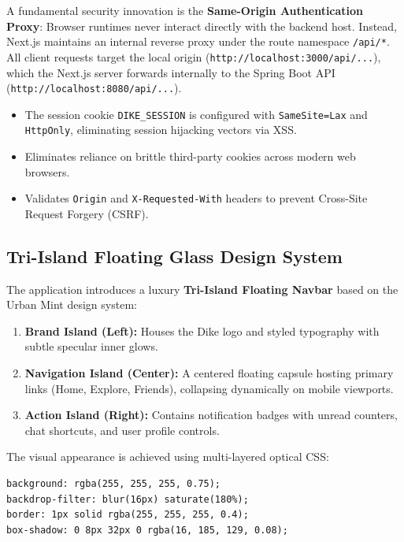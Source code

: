 \documentclass[conference,10pt,a4paper]{IEEEtran}
\begin{document}
A fundamental security innovation is the \textbf{Same-Origin Authentication Proxy}:
Browser runtimes never interact directly with the backend host. Instead, Next.js maintains an internal reverse proxy under the route namespace \texttt{/api/*}. All client requests target the local origin (\texttt{http://localhost:3000/api/...}), which the Next.js server forwards internally to the Spring Boot API (\texttt{http://localhost:8080/api/...}).
\begin{itemize}
    \item The session cookie \texttt{DIKE\_SESSION} is configured with \texttt{SameSite=Lax} and \texttt{HttpOnly}, eliminating session hijacking vectors via XSS.
    \item Eliminates reliance on brittle third-party cookies across modern web browsers.
    \item Validates \texttt{Origin} and \texttt{X-Requested-With} headers to prevent Cross-Site Request Forgery (CSRF).
\end{itemize}

\subsection{Tri-Island Floating Glass Design System}
The application introduces a luxury \textbf{Tri-Island Floating Navbar} based on the Urban Mint design system:
\begin{enumerate}
    \item \textbf{Brand Island (Left):} Houses the Dike logo and styled typography with subtle specular inner glows.
    \item \textbf{Navigation Island (Center):} A centered floating capsule hosting primary links (Home, Explore, Friends), collapsing dynamically on mobile viewports.
    \item \textbf{Action Island (Right):} Contains notification badges with unread counters, chat shortcuts, and user profile controls.
\end{enumerate}
The visual appearance is achieved using multi-layered optical CSS:
\begin{lstlisting}[language=HTML,caption={Optical Liquid Glass CSS Styling}]
background: rgba(255, 255, 255, 0.75);
backdrop-filter: blur(16px) saturate(180%);
border: 1px solid rgba(255, 255, 255, 0.4);
box-shadow: 0 8px 32px 0 rgba(16, 185, 129, 0.08);
\end{lstlisting}
\end{document}
